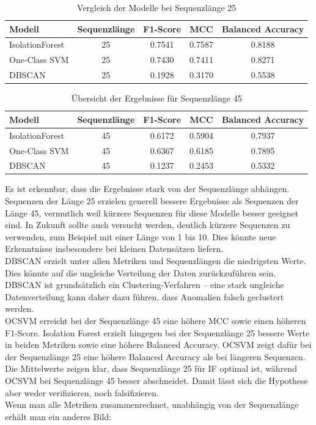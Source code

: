 \documentclass[a4paper,12pt]{article}
\begin{document}
	\begin{table}[H]
		\centering
		\caption{Vergleich der Modelle bei Sequenzlänge 25}
		\begin{tabular}{lcccc}
			\hline
			Modell & Sequenzlänge & F1-Score & MCC & Balanced Accuracy \\
			\hline
			IsolationForest & 25 & 0.7541 & 0.7587 & 0.8188 \\
			One-Class SVM & 25 & 0.7430 & 0.7411 & 0.8271 \\
			DBSCAN & 25 & 0.1928 & 0.3170 & 0.5538 \\
			\hline
		\end{tabular}
	\end{table}
	
	\begin{table}[H]
		\centering
		\caption{Übersicht der Ergebnisse für Sequenzlänge 45}
		\begin{tabular}{lcccc}
			\hline
			Modell & Sequenzlänge & F1-Score & MCC & Balanced Accuracy \\
			\hline
			IsolationForest & 45 & 0.6172 & 0.5904 & 0.7937 \\
			One-Class SVM & 45 & 0.6367 & 0.6185 & 0.7895 \\
			DBSCAN & 45 & 0.1237 & 0.2453 & 0.5332 \\
			\hline
		\end{tabular}
	\end{table}
	
	Es ist erkennbar, dass die Ergebnisse stark von der Sequenzlänge abhängen. Sequenzen der Länge 25 erzielen generell bessere Ergebnisse als Sequenzen der Länge 45, vermutlich weil kürzere Sequenzen für diese Modelle besser geeignet sind. In Zukunft sollte auch versucht werden, deutlich kürzere Sequenzen zu verwenden, zum Beispiel mit einer Länge von 1 bis 10. Dies könnte neue Erkenntnisse insbesondere bei kleinen Datensätzen liefern.
	\\[0.5em]
	DBSCAN erzielt unter allen Metriken und Sequenzlängen die niedrigsten Werte. Dies könnte auf die ungleiche Verteilung der Daten zurückzuführen sein. DBSCAN ist grundsätzlich ein Clustering-Verfahren – eine stark ungleiche Datenverteilung kann daher dazu führen, dass Anomalien falsch geclustert werden.
	\\[0.5em]
	OCSVM erreicht bei der Sequenzlänge 45 eine höhere MCC sowie einen höheren F1-Score. Isolation Forest erzielt hingegen bei der Sequenzlänge 25 bessere Werte in beiden Metriken sowie eine höhere Balanced Accuracy. OCSVM zeigt dafür bei der Sequenzlänge 25 eine höhere Balanced Accuracy als bei längeren Sequenzen.
	\\[0.5em]
	Die Mittelwerte zeigen klar, dass Sequenzlänge 25 für IF optimal ist, während OCSVM bei Sequenzlänge 45 besser abschneidet. Damit lässt sich die Hypothese aber weder verifizieren, noch falsifizieren.
	\\[0.5em]
	Wenn man alle Metriken zusammenrechnet, unabhängig von der Sequenzlänge erhält man ein anderes Bild:
	
\end{document}
